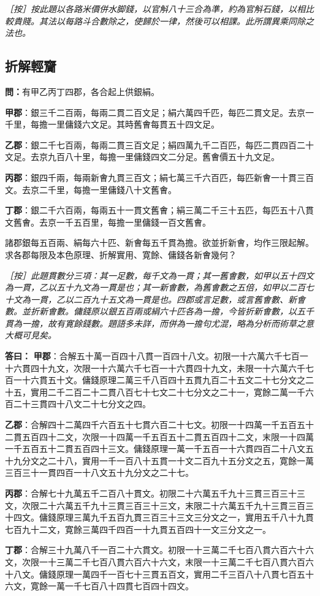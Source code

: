\documentclass[11pt,a4paper]{article}
\newcommand{\Question}[1]{\par\noindent\textbf{\color{problemcolor}問：}#1\par}
\newcommand{\Answer}[1]{\par\noindent\textbf{\color{answercolor}答曰：}#1\par}
\newcommand{\EditorialNote}[1]{\par\noindent\textit{［按］#1}\par}
\begin{document}
\EditorialNote{按此題以各路米價併水脚錢，以官斛八十三合為準，約為官斛石錢，以相比較貴賤。其法以每路斗合數除之，使歸於一律，然後可以相課。此所謂異乘同除之法也。}

\newpage
\subsection*{\color{sectioncolor}折解輕齎}

\Question{有甲乙丙丁四郡，各合起上供銀絹。

\textbf{甲郡}：銀三千二百兩，每兩二貫二百文足；絹六萬四千匹，每匹二貫文足。去京一千里，每擔一里傭錢六文足。其時舊㑹每貫五十四文足。

\textbf{乙郡}：銀二千七百兩，每兩二貫三百文足；絹四萬九千二百匹，每匹二貫四百二十文足。去京九百八十里，每擔一里傭錢四文二分足。舊㑹價五十九文足。

\textbf{丙郡}：銀四千兩，每兩新㑹九貫三百文；絹七萬三千六百匹，每匹新㑹一十貫三百文。去京二千里，每擔一里傭錢八十文舊㑹。

\textbf{丁郡}：銀二千六百兩，每兩五十一貫文舊㑹；絹三萬二千三十五匹，每匹五十八貫文舊㑹。去京一千五百里，每擔一里傭錢一百文舊㑹。

諸郡銀每五百兩、絹每六十匹、新㑹每五千貫為擔。欲並折新㑹，均作三限起解。求各郡每限及本色原理、折解實用、寛餘、傭錢各新㑹幾何？}

\EditorialNote{此題貫數分三項：其一足數，每千文為一貫；其一舊㑹數，如甲以五十四文為一貫，乙以五十九文為一貫是也；其一新㑹數，為舊㑹數之五倍，如甲以二百七十文為一貫，乙以二百九十五文為一貫是也。四郡或言足數，或言舊㑹數、新㑹數。並折新㑹數。傭錢原以銀五百兩或絹六十匹各為一擔，今皆折新㑹數，以五千貫為一擔，故有寛餘錢數。題語多未詳，而併為一擔句尤混，略為分析而術草之意大概可見矣。}

\Answer{
\textbf{甲郡}：合解五十萬一百四十八貫一百四十八文。初限一十六萬六千七百一十六貫四十九文，次限一十六萬六千七百一十六貫四十九文，未限一十六萬六千七百一十六貫五十文。傭錢原理二萬三千八百四十五貫九百二十五文二十七分文之二十五，實用二千二百二十二貫八百七十七文二十七分文之二十一，寛餘二萬一千六百二十三貫四十八文二十七分文之四。

\textbf{乙郡}：合解四十二萬四千六百五十七貫六百二十七文。初限一十四萬一千五百五十二貫五百四十二文，次限一十四萬一千五百五十二貫五百四十二文，末限一十四萬一千五百五十二貫五百四十三文。傭錢原理一萬一千五百一十六貫四百二十八文五十九分文之二十八，實用一千一百八十五貫一十文二百九十五分文之五，寛餘一萬三百三十一貫四百一十八文五十九分文之二十七。

\textbf{丙郡}：合解七十九萬五千二百八十貫文。初限二十六萬五千九十三貫三百三十三文，次限二十六萬五千九十三貫三百三十三文，末限二十六萬五千九十三貫三百三十四文。傭錢原理三萬九千五百九貫三百三十三文三分文之一，實用五千八十九貫七百九十二文，寛餘三萬四千四百一十九貫五百四十一文三分文之一。

\textbf{丁郡}：合解三十九萬八千一百二十六貫文。初限一十三萬二千七百八貫六百六十六文，次限一十三萬二千七百八貫六百六十六文，末限一十三萬二千七百八貫六百六十八文。傭錢原理一萬四千一百七十三貫五百文，實用二千三百八十八貫七百五十六文，寛餘一萬一千七百八十四貫七百四十四文。}
\end{document}
